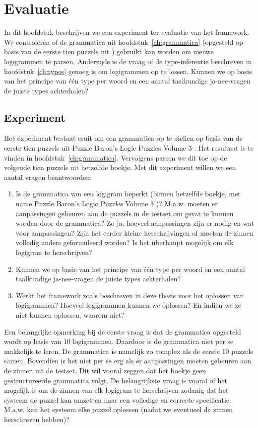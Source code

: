 \chapter{Evaluatie}
\label{ch:evaluatie}

In dit hoofdstuk beschrijven we een experiment ter evaluatie van het framework. We controleren of de grammatica uit hoofdstuk~\ref{ch:grammatica} (opgesteld op basis van de eerste tien puzzels uit \cite{logigrammen}) gebruikt kan worden om nieuwe logigrammen te parsen. Anderzijds is de vraag of de type-inferentie beschreven in hoofdstuk~\ref{ch:types} genoeg is om logigrammen op te lossen. Kunnen we op basis van het principe van één type per woord en een aantal taalkundige ja-nee-vragen de juiste types achterhalen?

\section{Experiment}
Het experiment bestaat eruit om een grammatica op te stellen op basis van de eerste tien puzzels uit Puzzle Baron's Logic Puzzles Volume 3 \cite{logigrammen}. Het resultaat is te vinden in hoofdstuk~\ref{ch:grammatica}. Vervolgens passen we dit toe op de volgende tien puzzels uit hetzelfde boekje. Met dit experiment willen we een aantal vragen beantwoorden:

\begin{enumerate}
  \item Is de grammatica van een logigram beperkt (binnen hetzelfde boekje, met name Puzzle Baron's Logic Puzzles Volume 3 \cite{logigrammen})? M.a.w. moeten er aanpassingen gebeuren aan de puzzels in de testset om gevat te kunnen worden door de grammatica? Zo ja, hoeveel aanpassingen zijn er nodig en wat voor aanpassingen? Zijn het eerder kleine herschrijvingen of moeten de zinnen volledig anders geformuleerd worden? Is het überhaupt mogelijk om elk logigram te herschrijven?
  \item Kunnen we op basis van het principe van één type per woord en een aantal taalkundige ja-nee-vragen de juiste types achterhalen?
  \item Werkt het framework zoals beschreven in deze thesis voor het oplossen van logigrammen? Hoeveel logigrammen kunnen we oplossen? En indien we ze niet kunnen oplossen, waarom niet?
\end{enumerate}

Een belangrijke opmerking bij de eerste vraag is dat de grammatica opgesteld wordt op basis van 10 logigrammen. Daardoor is de grammatica niet per se makkelijk te leren. De grammatica is namelijk zo complex als de eerste 10 puzzels samen. Bovendien is het niet per se erg als er aanpassingen moeten gebeuren aan de zinnen uit de testset. Dit wil vooral zeggen dat het boekje geen gestructureerde grammatica volgt. De belangrijkste vraag is vooral of het mogelijk is om de zinnen van elk logigram te herschrijven zodanig dat het systeem de puzzel kan omzetten naar een volledige en correcte specificatie. M.a.w. kan het systeem elke puzzel oplossen (nadat we eventueel de zinnen herschreven hebben)?
 
